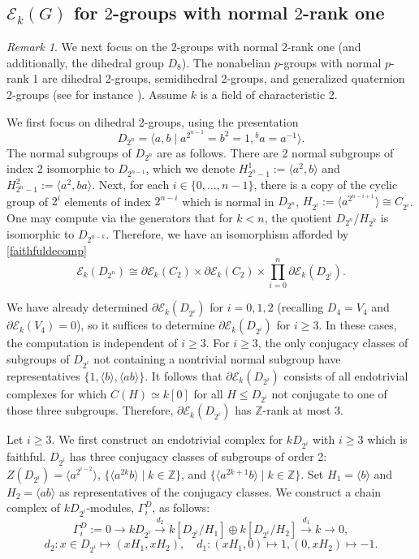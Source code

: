 \documentclass[10pt,letterpaper, boxed, cm]{amsart}
\newcommand{\Z}{\mathbb{Z}}
\newcommand{\inv}{^{-1}}
\newcommand{\calE}{\mathcal{E}}
\theoremstyle{remark}
\newtheorem{remark}[theorem]{Remark}
\theoremstyle{definition}
\begin{document}
	\subsection{$\calE_k(G)$ for $2$-groups with normal $2$-rank one}

	\begin{remark}\label{dihedralfaithfulendotrivialcomplex}
		We next focus on the $2$-groups with normal $2$-rank one (and additionally, the dihedral group $D_8$). The nonabelian $p$-groups with normal $p$-rank 1 are dihedral 2-groups, semidihedral 2-groups, and generalized quaternion 2-groups (see for instance \cite[Lemma 9.3.3]{Bou10}). Assume $k$ is a field of characteristic 2.

		We first focus on dihedral 2-groups, using the presentation \[D_{2^n} = \langle a ,b\mid a^{2^{n-1}} = b^2 = 1, {}^ba = a\inv\rangle.\] The normal subgroups of $D_{2^n}$ are as follows. There are 2 normal subgroups of index 2 isomorphic to $D_{2^{n-1}}$, which we denote $H^1_{2^n - 1} := \langle a^2, b \rangle$ and $H^2_{2^n - 1} := \langle a^2, ba \rangle.$ Next, for each $i \in \{0, \dots, n-1\}$, there is a copy of the cyclic group of $2^i$ elements of index $2^{n-i}$ which is normal in $D_{2^n}$, $H_{2^i} := \langle a^{2^{n - i + 1}} \rangle\cong C_{2^i}$. One may compute via the generators that for $k < n$, the quotient $D_{2^n}/H_{2^k}$ is isomorphic to $D_{2^{n-k}}$. Therefore, we have an isomorphism afforded by \ref{faithfuldecomp} \[\calE_k(D_{2^n})\cong \partial\calE_k(C_2)\times \partial\calE_k(C_2)\times \prod_{i=0}^n \partial\calE_k(D_{2^i}). \]

		We have already determined $\partial\calE_k(D_{2^i})$ for $i = 0,1,2$ (recalling $D_4 = V_4$ and $\partial\calE_k(V_4) = 0$), so it suffices to determine $\partial\calE_k(D_{2^i})$ for $i \geq 3$. In these cases, the computation is independent of $i \geq 3$. For $i \geq 3$, the only conjugacy classes of subgroups of $D_{2^i}$ not containing a nontrivial normal subgroup have representatives $\{1, \langle b\rangle, \langle ab \rangle\}.$ It follows that $\partial\calE_k(D_{2^i})$ consists of all endotrivial complexes for which $C(H) \simeq k[0]$ for all $H \leq D_{2^i}$ not conjugate to one of those three subgroups. Therefore, $\partial\calE_k(D_{2^i})$ has $\Z$-rank at most 3.

		Let $i \geq 3$. We first construct an endotrivial complex for $kD_{2^i}$ with $i \geq 3$ which is faithful. $D_{2^i}$ has three conjugacy classes of subgroups of order 2: $Z(D_{2^i}) = \langle a^{2^{i-2}} \rangle$, $\{\langle a^{2k}b\rangle \mid k \in \Z\}$, and $\{\langle a^{2k+1}b\rangle \mid k \in \Z\}$. Set $H_1 = \langle b\rangle$ and $H_2 = \langle ab \rangle$ as representatives of the conjugacy classes. We construct a chain complex of $kD_{2^i}$-modules, $\Gamma^D_i$, as follows:
		\[\Gamma^D_i := 0 \to kD_{2^i} \xrightarrow{d_2} k[D_{2^i}/H_1] \oplus k[D_{2^i}/H_2] \xrightarrow{d_{1}} k \to 0,\]
		\[d_2: x \in D_{2^i} \mapsto (xH_1, xH_2), \quad d_1: (xH_1, 0) \mapsto 1, (0, xH_2) \mapsto -1.\]


\end{remark}
\end{document}
